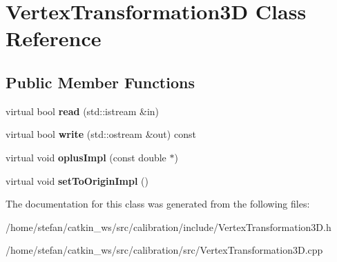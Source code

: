 \hypertarget{classVertexTransformation3D}{\section{\-Vertex\-Transformation3\-D \-Class \-Reference}
\label{classVertexTransformation3D}
}
\subsection*{\-Public \-Member \-Functions}
\begin{DoxyCompactItemize}
\item 
\hypertarget{classVertexTransformation3D_a27cbcba13590e4d1985813d6f4f43d9f}{virtual bool {\bfseries read} (std\-::istream \&in)}\label{classVertexTransformation3D_a27cbcba13590e4d1985813d6f4f43d9f}

\item 
\hypertarget{classVertexTransformation3D_a0aa1f47af0ced2ced081b2dfe8533fd9}{virtual bool {\bfseries write} (std\-::ostream \&out) const }\label{classVertexTransformation3D_a0aa1f47af0ced2ced081b2dfe8533fd9}

\item 
\hypertarget{classVertexTransformation3D_a86bd4cf36cb0bfa652357e4d2ca958f3}{virtual void {\bfseries oplus\-Impl} (const double $\ast$)}\label{classVertexTransformation3D_a86bd4cf36cb0bfa652357e4d2ca958f3}

\item 
\hypertarget{classVertexTransformation3D_a03f2a8897a5e859728b94a5495dcce4d}{virtual void {\bfseries set\-To\-Origin\-Impl} ()}\label{classVertexTransformation3D_a03f2a8897a5e859728b94a5495dcce4d}

\end{DoxyCompactItemize}


\-The documentation for this class was generated from the following files\-:\begin{DoxyCompactItemize}
\item 
/home/stefan/catkin\-\_\-ws/src/calibration/include/\-Vertex\-Transformation3\-D.\-h\item 
/home/stefan/catkin\-\_\-ws/src/calibration/src/\-Vertex\-Transformation3\-D.\-cpp\end{DoxyCompactItemize}
